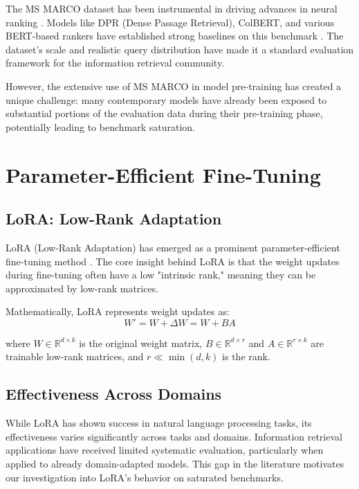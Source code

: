 The MS MARCO dataset has been instrumental in driving advances in neural ranking \cite{msmarco}. Models like DPR (Dense Passage Retrieval), ColBERT, and various BERT-based rankers \cite{devlin2018bert} have established strong baselines on this benchmark \cite{khattab2020colbert}. The dataset's scale and realistic query distribution have made it a standard evaluation framework for the information retrieval community.

However, the extensive use of MS MARCO in model pre-training has created a unique challenge: many contemporary models have already been exposed to substantial portions of the evaluation data during their pre-training phase, potentially leading to benchmark saturation.

\section{Parameter-Efficient Fine-Tuning}

\subsection{LoRA: Low-Rank Adaptation}

LoRA (Low-Rank Adaptation) has emerged as a prominent parameter-efficient fine-tuning method \cite{hu2021lora}. The core insight behind LoRA is that the weight updates during fine-tuning often have a low "intrinsic rank," meaning they can be approximated by low-rank matrices.

Mathematically, LoRA represents weight updates as:
\begin{equation}
W' = W + \Delta W = W + BA
\end{equation}

where $W \in \mathbb{R}^{d \times k}$ is the original weight matrix, $B \in \mathbb{R}^{d \times r}$ and $A \in \mathbb{R}^{r \times k}$ are trainable low-rank matrices, and $r \ll \min(d,k)$ is the rank.

\subsection{Effectiveness Across Domains}

While LoRA has shown success in natural language processing tasks, its effectiveness varies significantly across tasks and domains. Information retrieval applications have received limited systematic evaluation, particularly when applied to already domain-adapted models. This gap in the literature motivates our investigation into LoRA's behavior on saturated benchmarks.


